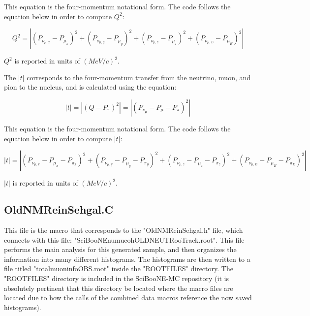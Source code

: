 \documentclass[11pt]{article}
\begin{document}
\noindent
This equation is the four-momentum notational form. The code follows the equation below in order to compute $Q^2$:

\begin{equation}
Q^2 = |(P_{\nu_{\mu,x}} - P_{\mu_x})^2 + (P_{\nu_{\mu,y}} - P_{\mu_y})^2 + (P_{\nu_{\mu,z}} - P_{\mu_z})^2 + (P_{\nu_{\mu,E}} - P_{\mu_E})^2|
\end{equation}

\noindent
$Q^2$ is reported in units of $(MeV/c)^2$.

The $|t|$ corresponds to the four-momentum transfer from the neutrino, muon, and pion to the nucleus, and is calculated using the equation:

\begin{equation}
|t| = |(Q - P_\pi)^2| = |(P_{\nu_\mu} - P_\mu - P_\pi)^2|
\end{equation}

\noindent
This equation is the four-momentum notational form. The code follows the equation below in order to compute $|t|$:

\begin{equation}
|t| = |(P_{\nu_{\mu,x}} - P_{\mu_x} - P_{\pi_x})^2 + (P_{\nu_{\mu,y}} - P_{\mu_y} - P_{\pi_y})^2 + (P_{\nu_{\mu,z}} - P_{\mu_z} - P_{\pi_z})^2 + (P_{\nu_{\mu,E}} - P_{\mu_E} - P_{\pi_E})^2|
\end{equation}

\noindent
$|t|$ is reported in units of $(MeV/c)^2$.

\subsection{OldNMReinSehgal.C}
This file is the macro that corresponds to the "OldNMReinSehgal.h" file, which connects with this file: "SciBooNE\textunderscore numu\textunderscore coh\textunderscore OLDNEUT\textunderscore RooTrack.root". This file performs the main analysis for this generated sample, and then organizes the information into many different histograms. The histograms are then written to a file titled "totalmuoninfoOBS.root" inside the "ROOTFILES" directory. The "ROOTFILES" directory is included in the SciBooNE-MC repository (it is absolutely pertinent that this directory be located where the macro files are located due to how the calls of the combined data macros reference the now saved histograms).
\end{document}
